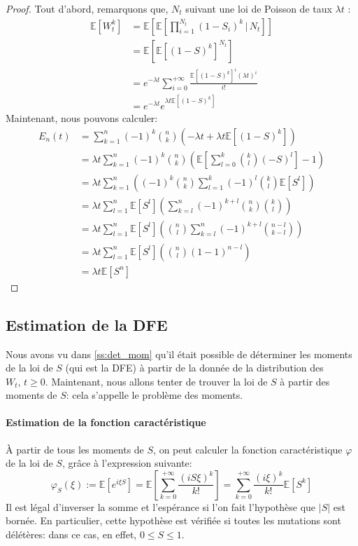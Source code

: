 \documentclass[12pt]{article}
\newcommand{\pth}[1]{\left(#1\right)}
\newcommand{\cro}[1]{\left[#1\right]}
\newcommand{\abs}[1]{\left|#1\right|}
\newcommand{\vg}{,\,}
\newcommand{\Esp}[1]{\mathbb{E}\cro{#1}}
\newcommand{\kt }{\,|\,}
\begin{document}
\begin{proof}
  Tout d'abord, remarquons que, $N_t$ suivant une loi de Poisson de taux $\lambda t$ :
  \begin{align*}
    \Esp{W_t^k}&=\Esp{\Esp{\prod_{i=1}^{N_t}(1-S_i)^k\kt N_t}}\\
    &=\Esp{\Esp{(1-S)^k}^{N_t}}\\
    &=e^{-\lambda t}\sum_{i=0}^{+\infty}\frac{\Esp{(1-S)^k}^i(\lambda t)^i}{i!}\\
    &=e^{-\lambda t}e^{\lambda t\Esp{(1-S)^k}}
  \end{align*}
  Maintenant, nous pouvons calculer:
  \begin{align*}
    E_n(t)&=\sum_{k=1}^n(-1)^k\binom{n}{k}\pth{-\lambda t+\lambda t\Esp{(1-S)^k}}\\
    &=\lambda t\sum_{k=1}^n(-1)^k\binom{n}{k}\pth{\Esp{\sum_{l=0}^k\binom{k}{l}\pth{-S}^l}-1}\\
    &=\lambda t\sum_{k=1}^n\pth{(-1)^k\binom{n}{k}\sum_{l=1}^k(-1)^l\binom{k}{l}\Esp{S^l}}\\
    &=\lambda t\sum_{l=1}^n\Esp{S^l}\pth{\sum_{k=l}^n(-1)^{k+l}\binom{n}{k}\binom{k}{l}}\\
    &=\lambda t\sum_{l=1}^n\Esp{S^l}\pth{\binom{n}{l}\sum_{k=l}^n(-1)^{k+l}\binom{n-l}{k-l}}\\
    &=\lambda t\sum_{l=1}^n\Esp{S^l}\pth{\binom{n}{l}(1-1)^{n-l}}\\
    &=\lambda t\Esp{S^n}
  \end{align*}
\end{proof}




\subsection{Estimation de la DFE}

Nous avons vu dans \ref{ss:det_mom} qu'il était possible de déterminer les moments de la loi de $S$ (qui est la DFE) à partir de la donnée de la distribution des $W_t\vg t\geqslant 0$. Maintenant, nous allons tenter de trouver la loi de $S$ à partir des moments de $S$: cela s'appelle le problème des moments.

\paragraph{Estimation de la fonction caractéristique}

À partir de tous les moments de $S$, on peut calculer la fonction caractéristique $\varphi$ de la loi de $S$, grâce à l'expression suivante:
\[\varphi_S(\xi):=\Esp{e^{i\xi S}}=\Esp{\sum_{k=0}^{+\infty}\frac{(iS\xi)^k}{k!}}=\sum_{k=0}^{+\infty}\frac{(i\xi)^k}{k!}\Esp{S^k}\]
Il est légal d'inverser la somme et l'espérance si l'on fait l'hypothèse que $\abs{S}$ est bornée. En particulier, cette hypothèse est vérifiée si toutes les mutations sont délétères: dans ce cas, en effet, $0\leqslant S\leqslant 1$.
\end{document}
